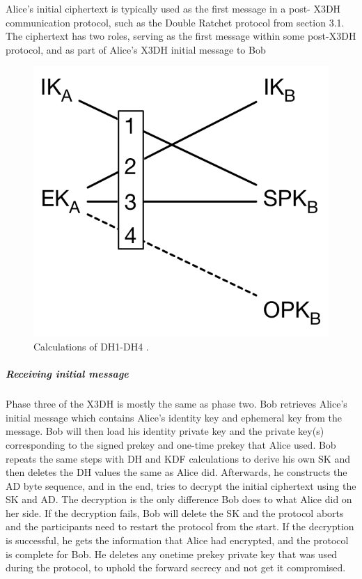 Alice’s initial ciphertext is typically used as the first message in a post-
X3DH communication protocol, such as the Double Ratchet protocol from
section 3.1. The ciphertext has two roles, serving as the first message within
some post-X3DH protocol, and as part of Alice’s X3DH initial message to
Bob


\begin{figure}[H]
	\centering
	\includegraphics{figures/tripledh.png}
	\caption{Calculations of DH1-DH4 \cite{tripledh}.}
	\label{fig:tripledh}
\end{figure}


\subparagraph{Receiving initial message}

Phase three of the X3DH is mostly the same as phase two. Bob retrieves
Alice’s initial message which contains Alice’s identity key and ephemeral
key from the message. Bob will then load his identity private key and the
private key(s) corresponding to the signed prekey and one-time prekey that
Alice used.
Bob repeats the same steps with DH and KDF calculations to derive his
own SK and then deletes the DH values the same as Alice did. Afterwards,
he constructs the AD byte sequence, and in the end, tries to decrypt the
initial ciphertext using the SK and AD. The decryption is the only difference
Bob does to what Alice did on her side. If the decryption fails, Bob will
delete the SK and the protocol aborts and the participants need to restart
the protocol from the start.
If the decryption is successful, he gets the information that Alice had
encrypted, and the protocol is complete for Bob. He deletes any onetime
prekey private key that was used during the protocol, to uphold the
forward secrecy and not get it compromised.

